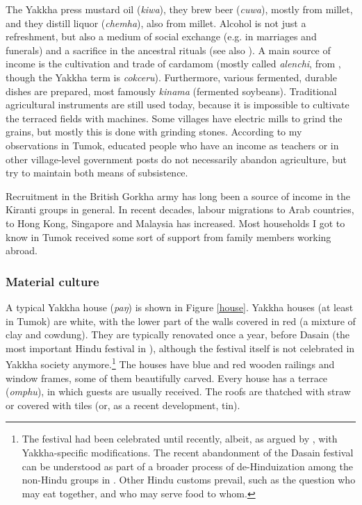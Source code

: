 The Yakkha press mustard oil (\emph{kiwa}), they brew beer (\emph{cuwa}), mostly from millet, and they distill liquor (\emph{chemha}), also from millet. Alcohol is not just a refreshment, but also a medium of social exchange (e.g. in marriages and fune\-rals) and a sacrifice in the ancestral rituals (see also \citet[124]{Russell1992_Yakha}).  A main source of income is the cultivation and trade of cardamom (mostly called \emph{alenchi}, from , though the Yakkha term is \emph{cokceru}). Furthermore, various fermented, durable dishes are prepared, most famously \emph{kinama} (fermented soybeans). Traditional agricultural instruments are still used today, because it is impossible to cultivate the terraced fields with machines. Some villages have electric mills to grind the grains, but mostly this is done with grinding stones. According to my observations in Tumok, educated people who have an income as teachers or in other village-level government posts do not necessarily abandon agriculture, but try to maintain both means of subsistence. 

Recruitment in the British Gorkha army has long been a source of income in the Kiranti groups in general. In recent decades, labour migrations to Arab countries, to Hong Kong, Singapore and Malaysia has increased. Most households I got to know in Tumok received some sort of support from family members working abroad. 


\subsubsection{Material culture}

A typical Yakkha house (\emph{paŋ}) is shown in Figure \ref{house}. Yakkha houses (at least in Tumok) are white, with the lower part of the walls covered in red (a mixture of clay and cowdung). They are typically renovated once a year, before Dasain (the most important Hindu festival in ), although the festival itself is not celebrated in Yakkha society anymore.\footnote{The festival had been celebrated until recently, albeit, as argued by \citet{Russell2004Traditions}, with Yakkha-specific modifications. The recent abandonment of the Dasain festival can be understood as part of a broader process of de-Hinduization among the non-Hindu groups in . Other Hindu customs prevail, such as the question who may eat together, and who may serve food to whom.} The houses have blue and red wooden railings and window frames, some of them beautifully carved. Every house has a terrace (\emph{omphu}), in which guests are usually received. The roofs are thatched with straw or covered with tiles (or, as a recent development, tin).

